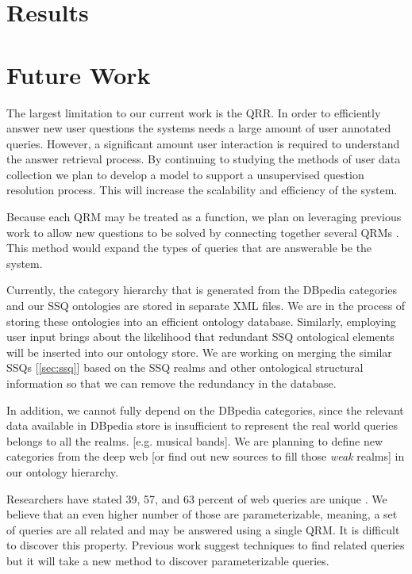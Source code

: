 \section{Results}

\section{Future Work}

The largest limitation to our current work is the QRR.  In order to efficiently answer new user questions the systems needs a large amount of user annotated queries.  However, a significant amount user interaction is required to understand the answer retrieval process.  By continuing to studying the methods of user data collection we plan to develop a model to support a unsupervised question resolution process.  This will increase the scalability and efficiency of the system.

Because each QRM may be treated as a function, we plan on leveraging previous work to allow new questions to be solved by connecting together several QRMs \cite{morpheus1, transformscout}.  This method would expand the types of queries that are answerable be the system.

Currently, the category hierarchy that is generated from the DBpedia categories and our SSQ ontologies are stored in separate XML files. We are in the process of storing these ontologies into an efficient ontology database. Similarly, employing user input brings about the likelihood that redundant SSQ ontological elements will be inserted into our ontology store. We are working on merging the similar SSQs [\ref{sec:ssq}] based on the SSQ realms and other ontological structural information so that we can remove the redundancy in the database.

In addition, we cannot fully depend on the DBpedia categories, since the relevant data available in DBpedia store is insufficient to represent the real world queries belongs to all the realms. [e.g. musical bands]. We are planning to define new categories from the deep web [or find out new sources to fill those \textit{weak} realms] in our ontology hierarchy.      

Researchers have stated 39, 57, and 63 percent of web queries are unique \cite{1277770,331405,621942}.  We believe that an even higher number of those are parameterizable, meaning, a set of queries are all related and may be answered using a single QRM.  It is difficult to discover this property.  Previous work suggest techniques to find related queries but it will take a new method to discover parameterizable queries.

